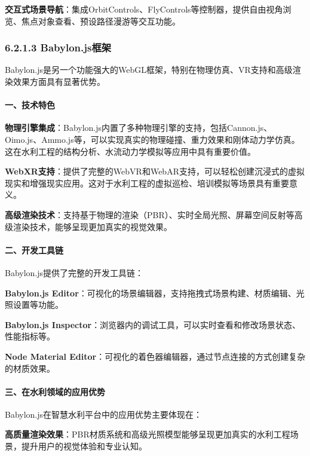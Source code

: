 \textbf{交互式场景导航}：集成OrbitControls、FlyControls等控制器，提供自由视角浏览、焦点对象查看、预设路径漫游等交互功能。

\subsubsection{6.2.1.3 Babylon.js框架}\label{babylon.jsux6846ux67b6}

Babylon.js是另一个功能强大的WebGL框架，特别在物理仿真、VR支持和高级渲染效果方面具有显著优势。

\paragraph{一、技术特色}\label{ux4e00ux6280ux672fux7279ux8272}

\textbf{物理引擎集成}：Babylon.js内置了多种物理引擎的支持，包括Cannon.js、Oimo.js、Ammo.js等，可以实现真实的物理碰撞、重力效果和刚体动力学仿真。这在水利工程的结构分析、水流动力学模拟等应用中具有重要价值。

\textbf{WebXR支持}：提供了完整的WebVR和WebAR支持，可以轻松创建沉浸式的虚拟现实和增强现实应用。这对于水利工程的虚拟巡检、培训模拟等场景具有重要意义。

\textbf{高级渲染技术}：支持基于物理的渲染（PBR）、实时全局光照、屏幕空间反射等高级渲染技术，能够呈现更加真实的视觉效果。

\paragraph{二、开发工具链}\label{ux4e8cux5f00ux53d1ux5de5ux5177ux94fe}

Babylon.js提供了完整的开发工具链：

\textbf{Babylon.js
Editor}：可视化的场景编辑器，支持拖拽式场景构建、材质编辑、光照设置等功能。

\textbf{Babylon.js
Inspector}：浏览器内的调试工具，可以实时查看和修改场景状态、性能指标等。

\textbf{Node Material
Editor}：可视化的着色器编辑器，通过节点连接的方式创建复杂的材质效果。

\paragraph{三、在水利领域的应用优势}\label{ux4e09ux5728ux6c34ux5229ux9886ux57dfux7684ux5e94ux7528ux4f18ux52bf}

Babylon.js在智慧水利平台中的应用优势主要体现在：

\textbf{高质量渲染效果}：PBR材质系统和高级光照模型能够呈现更加真实的水利工程场景，提升用户的视觉体验和专业认知。

